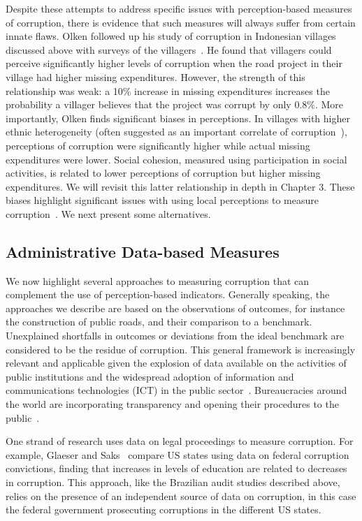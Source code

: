 Despite these attempts to address specific issues with perception-based measures of corruption, there is evidence that such measures will always suffer from certain innate flaws. Olken followed up his study of corruption in Indonesian villages discussed above with surveys of the villagers~\cite{olken2009corruption}. He found that villagers could perceive significantly higher levels of corruption when the road project in their village had higher missing expenditures. However, the strength of this relationship was weak: a 10\% increase in missing expenditures increases the probability a villager believes that the project was corrupt by only 0.8\%. More importantly, Olken finds significant biases in perceptions. In villages with higher ethnic heterogeneity (often suggested as an important correlate of corruption~\cite{mauro1995corruption}), perceptions of corruption were significantly higher while actual missing expenditures were lower. Social cohesion, measured using participation in social activities, is related to lower perceptions of corruption but higher missing expenditures. We will revisit this latter relationship in depth in Chapter 3. These biases highlight significant issues with using local perceptions to measure corruption~\cite{torsello2016anthropology}. We next present some alternatives.


\subsection{Administrative Data-based Measures}
We now highlight several approaches to measuring corruption that can complement the use of perception-based indicators. Generally speaking, the approaches we describe are based on the observations of outcomes, for instance the construction of public roads, and their comparison to a benchmark. Unexplained shortfalls in outcomes or deviations from the ideal benchmark are considered to be the residue of corruption. This general framework is increasingly relevant and applicable given the explosion of data available on the activities of public institutions and the widespread adoption of information and communications technologies (ICT) in the public sector~\cite{bertot2010using}. Bureaucracies around the world are incorporating transparency and opening their procedures to the public~\cite{kornberger2017bureaucracy}.

One strand of research uses data on legal proceedings to measure corruption. For example, Glaeser and Saks~\cite{glaeser2006corruption} compare US states using data on federal corruption convictions, finding that increases in levels of education are related to decreases in corruption. This approach, like the Brazilian audit studies described above, relies on the presence of an independent source of data on corruption, in this case the federal government prosecuting corruptions in the different US states.

